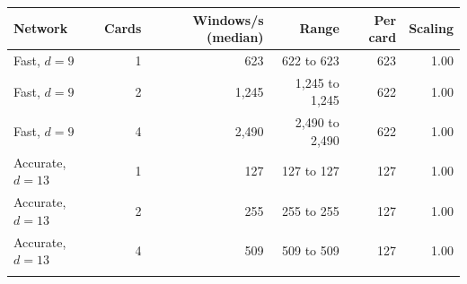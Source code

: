 \begin{tabular}{@{}lrrrrr@{}}
\toprule
Network & Cards & Windows/s (median) & Range & Per card & Scaling \\
\midrule
Fast, $d=9$ & 1 & 623 & 622 to 623 & 623 & 1.00 \\
Fast, $d=9$ & 2 & 1{,}245 & 1{,}245 to 1{,}245 & 622 & 1.00 \\
Fast, $d=9$ & 4 & 2{,}490 & 2{,}490 to 2{,}490 & 622 & 1.00 \\
\midrule
Accurate, $d=13$ & 1 & 127 & 127 to 127 & 127 & 1.00 \\
Accurate, $d=13$ & 2 & 255 & 255 to 255 & 127 & 1.00 \\
Accurate, $d=13$ & 4 & 509 & 509 to 509 & 127 & 1.00 \\
\botrule
\end{tabular}
